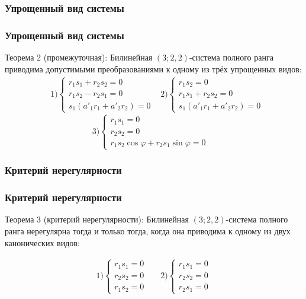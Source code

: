 \documentclass[russian,hyperref={unicode}]{beamer}
\begin{document}
\subsubsection{Упрощенный вид системы}
\frame
{
	\frametitle{Упрощенный вид системы}
	\begin{block}{Теорема 2 (промежуточная):}
	Билинейная $(3; 2, 2)$-система полного ранга приводима допустимыми 
	преобразованиями к одному из трёх упрощенных видов: 
	\begin{align*}
		&
		1)\begin{cases}
			r_1 s_1 + r_2 s_2 = 0 \\ 
			r_1 s_2 - r_2 s_1 = 0 \\ 
			s_1 (a'_{1} r_1 + a'_{2} r_2) = 0
		\end{cases}
		&
		2)\begin{cases}
			r_1 s_2 = 0 \\
			r_1 s_1 + r_2 s_2 = 0 \\
			s_1 (a'_{1} r_1 + a'_{2} r_2) = 0
		\end{cases} 
	\end{align*}
	$$
		3)\begin{cases}
		 	r_1 s_1 = 0 \\
		 	r_2 s_2 = 0 \\
		 	r_1 s_2 \cos \varphi + r_2 s_1 \sin \varphi = 0 &
		\end{cases}
	$$
	\end{block}
}
\subsubsection{Критерий нерегулярности}
\frame
{
	\frametitle{Критерий нерегулярности}
	\begin{block}{Теорема 3 (критерий нерегулярности):}
	Билинейная $(3;2,2)$-система полного ранга нерегулярна тогда и только тогда, когда 
	она приводима к одному из двух канонических видов:
	
	\begin{align*}
		&
		1)\begin{cases}
		 	r_1 s_1 = 0 \\
		 	r_2 s_2 = 0 \\
		 	r_1 s_2 = 0 &
		\end{cases}
		&
		2)\begin{cases}
			r_1 s_1 = 0 \\
		 	r_2 s_2 = 0 \\
		 	r_2 s_1 = 0 &
		\end{cases}
	\end{align*}
	\end{block}
}
\end{document}
